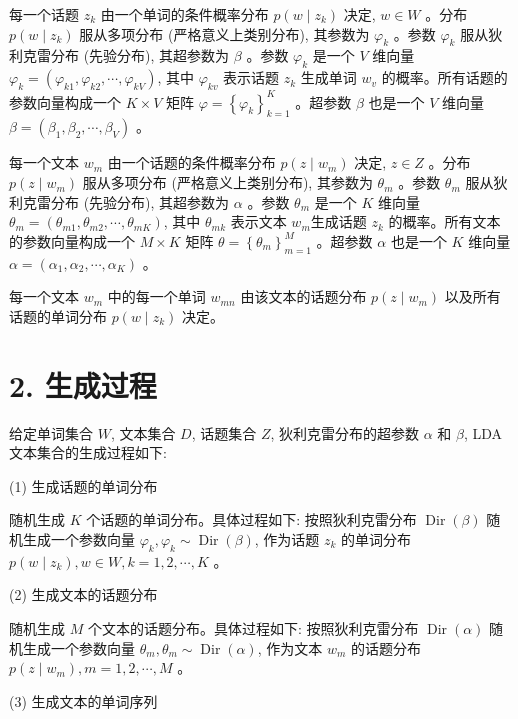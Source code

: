 \documentclass[10pt]{article}
\begin{document}
\begin{CJK*}{UTF8}{bsmi}
每一个话题 $z_{k}$ 由一个单词的条件概率分布 $p\left(w \mid z_{k}\right)$ 决定, $w \in W$ 。分布 $p\left(w \mid z_{k}\right)$ 服从多项分布 (严格意义上类别分布), 其参数为 $\varphi_{k}$ 。参数 $\varphi_{k}$ 服从狄利克雷分布 (先验分布), 其超参数为 $\beta$ 。参数 $\varphi_{k}$ 是一个 $V$ 维向量 $\varphi_{k}=\left(\varphi_{k 1}, \varphi_{k 2}, \cdots, \varphi_{k V}\right)$, 其中 $\varphi_{k v}$ 表示话题 $z_{k}$ 生成单词 $w_{v}$ 的概率。所有话题的参数向量构成一个 $K \times V$ 矩阵 $\varphi=\left\{\varphi_{k}\right\}_{k=1}^{K}$ 。超参数 $\beta$ 也是一个 $V$ 维向量 $\beta=\left(\beta_{1}, \beta_{2}, \cdots, \beta_{V}\right)$ 。

每一个文本 $w_{m}$ 由一个话题的条件概率分布 $p\left(z \mid w_{m}\right)$ 决定, $z \in Z$ 。分布 $p\left(z \mid w_{m}\right)$ 服从多项分布 (严格意义上类别分布), 其参数为 $\theta_{m}$ 。参数 $\theta_{m}$ 服从狄利克雷分布 (先验分布), 其超参数为 $\alpha$ 。参数 $\theta_{m}$ 是一个 $K$ 维向量 $\theta_{m}=\left(\theta_{m 1}, \theta_{m 2}, \cdots, \theta_{m K}\right)$, 其中 $\theta_{m k}$ 表示文本 $w_{m}$生成话题 $z_{k}$ 的概率。所有文本的参数向量构成一个 $M \times K$ 矩阵 $\theta=\left\{\theta_{m}\right\}_{m=1}^{M}$ 。超参数 $\alpha$ 也是一个 $K$ 维向量 $\alpha=\left(\alpha_{1}, \alpha_{2}, \cdots, \alpha_{K}\right)$ 。

每一个文本 $w_{m}$ 中的每一个单词 $w_{m n}$ 由该文本的话题分布 $p\left(z \mid w_{m}\right)$ 以及所有话题的单词分布 $p\left(w \mid z_{k}\right)$ 决定。

\section*{2. 生成过程}
给定单词集合 $W$, 文本集合 $D$, 话题集合 $Z$, 狄利克雷分布的超参数 $\alpha$ 和 $\beta$, LDA 文本集合的生成过程如下:

(1) 生成话题的单词分布

随机生成 $K$ 个话题的单词分布。具体过程如下: 按照狄利克雷分布 $\operatorname{Dir}(\beta)$ 随机生成一个参数向量 $\varphi_{k}, \varphi_{k} \sim \operatorname{Dir}(\beta)$, 作为话题 $z_{k}$ 的单词分布 $p\left(w \mid z_{k}\right), w \in W, k=1,2, \cdots, K$ 。

(2) 生成文本的话题分布

随机生成 $M$ 个文本的话题分布。具体过程如下: 按照狄利克雷分布 $\operatorname{Dir}(\alpha)$ 随机生成一个参数向量 $\theta_{m}, \theta_{m} \sim \operatorname{Dir}(\alpha)$, 作为文本 $w_{m}$ 的话题分布 $p\left(z \mid w_{m}\right), m=1,2, \cdots, M$ 。

(3) 生成文本的单词序列


\end{CJK*}
\end{document}
